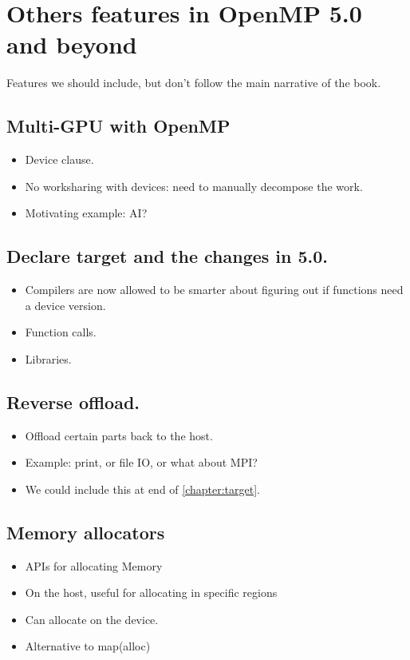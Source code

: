 
\chapter{Others features in OpenMP 5.0 and beyond}
\label{chapter:future}

Features we should include, but don't follow the main narrative of the book.

\section{Multi-GPU with OpenMP}
\begin{itemize}
    \item Device clause.
    \item No worksharing with devices: need to manually decompose the work.
    \item Motivating example: AI?
\end{itemize}

\section{Declare target and the changes in 5.0.}
\begin{itemize}
    \item Compilers are now allowed to be smarter about figuring out if functions need a device version.
    \item Function calls.
    \item Libraries.
\end{itemize}

\section{Reverse offload.}
\begin{itemize}
    \item Offload certain parts back to the host.
    \item Example: print, or file IO, or what about MPI?
    \item We could include this at end of \ref{chapter:target}.
\end{itemize}

\section{Memory allocators}
\begin{itemize}
    \item APIs for allocating Memory
    \item On the host, useful for allocating in specific regions
    \item Can allocate on the device.
    \item Alternative to map(alloc)
\end{itemize}


